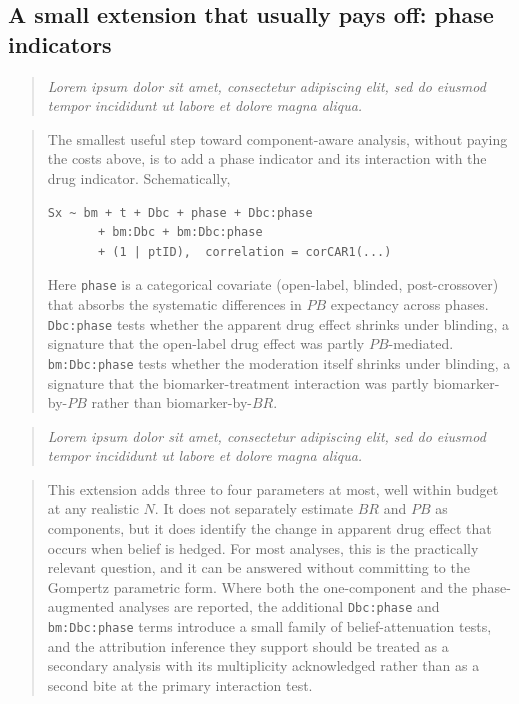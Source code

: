 \documentclass[
  11pt,
]{article}
\newenvironment{rgt}{%
  \begin{quote}\small\itshape\color[RGB]{20,60,160}}{%
  \end{quote}}
\newenvironment{orig}{%
  \begin{quote}\normalsize\color[gray]{0.55}}{%
  \end{quote}}
\begin{document}
\subsection{A small extension that usually pays off: phase indicators}\label{a-small-extension-that-usually-pays-off-phase-indicators}

\begin{rgt}
Lorem ipsum dolor sit amet, consectetur adipiscing elit, sed do eiusmod tempor incididunt ut labore et dolore magna aliqua.

\end{rgt}

\begin{orig}
The smallest useful step toward component-aware analysis,
without paying the costs above, is to add a phase indicator
and its interaction with the drug indicator. Schematically,

\begin{verbatim}
Sx ~ bm + t + Dbc + phase + Dbc:phase
       + bm:Dbc + bm:Dbc:phase
       + (1 | ptID),  correlation = corCAR1(...)
\end{verbatim}

Here \texttt{phase} is a categorical covariate (open-label,
blinded, post-crossover) that absorbs the systematic differences
in \(PB\) expectancy across phases. \texttt{Dbc:phase} tests
whether the apparent drug effect shrinks under blinding, a
signature that the open-label drug effect was partly
\(PB\)-mediated. \texttt{bm:Dbc:phase} tests whether the
moderation itself shrinks under blinding, a signature that the
biomarker-treatment interaction was partly
biomarker-by-\(PB\) rather than biomarker-by-\(BR\).

\end{orig}

\begin{rgt}
Lorem ipsum dolor sit amet, consectetur adipiscing elit, sed do eiusmod tempor incididunt ut labore et dolore magna aliqua.

\end{rgt}

\begin{orig}
This extension adds three to four parameters at most, well
within budget at any realistic \(N\). It does not separately
estimate \(BR\) and \(PB\) as components, but it does identify the
change in apparent drug effect that occurs when belief is
hedged. For most analyses, this is the practically relevant
question, and it can be answered without committing to the
Gompertz parametric form. Where both the one-component and the
phase-augmented analyses are reported, the additional
\texttt{Dbc:phase} and \texttt{bm:Dbc:phase} terms introduce a
small family of belief-attenuation tests, and the attribution
inference they support should be treated as a
secondary analysis with its multiplicity acknowledged rather than
as a second bite at the primary interaction test.

\end{orig}
\end{document}
